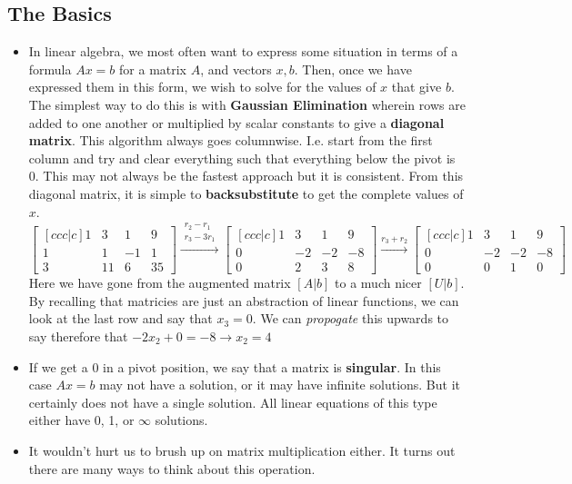 \documentclass[11pt]{article}
\begin{document}
\subsection{The Basics}
\begin{itemize}
	\item    In linear algebra, we most often want to express some situation in terms of a formula $Ax=b$ for a matrix $A$, and vectors $x, b$. Then, once we have expressed them in this form, we wish to solve for the values of $x$ that give $b$. The simplest way to do this is with \textbf{Gaussian Elimination} wherein rows are added to one another or multiplied by scalar constants to give a \textbf{diagonal matrix}. This algorithm always goes columnwise. I.e. start from the first column and try and clear everything such that everything below the pivot is 0. This may not always be the fastest approach but it is consistent. From this diagonal matrix, it is simple to \textbf{backsubstitute} to get the complete values of $x$.
		$$\begin{bmatrix}[ccc|c]
  1 & 3 & 1 & 9\\
1 & 1 & -1 & 1\\
3 & 11 & 6 & 35
\end{bmatrix} \xrightarrow{\substack{r_{2}-r_{1} \\ r_{3}-3r_{1}}} \begin{bmatrix}[ccc|c]
  1 & 3 & 1 & 9\\
0 & -2 & -2 & -8\\
0 & 2 & 3 & 8
\end{bmatrix} \xrightarrow{r_{3}+r_{2}}\begin{bmatrix}[ccc|c]
  1 & 3 & 1 & 9\\
0 & -2 & -2 & -8\\
0 & 0 & 1 & 0
\end{bmatrix}$$
Here we have gone from the augmented matrix $[ A | b]$ to a much nicer $[U | b]$. By recalling that matricies are just an abstraction of linear functions, we can look at the last row and say that $x_{3}=0$. We can \textit{propogate} this upwards to say therefore that $-2x_{2}+0=-8 \to x_{2}=4$
\item If we get a 0 in a pivot position, we say that a matrix is \textbf{singular}. In this case $Ax=b$ may not have a solution, or it may have infinite solutions. But it certainly does not have a single solution. All linear equations of this type either have 0, 1, or $\infty$ solutions.
\item It wouldn't hurt us to brush up on matrix multiplication either. It turns out there are many ways to think about this operation.

\end{itemize}
\end{document}
